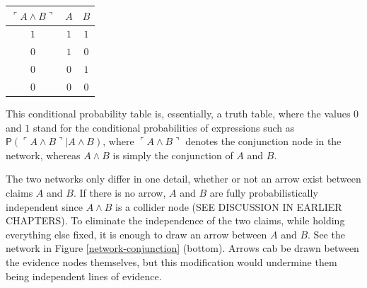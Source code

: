 \documentclass[10pt,dvipsnames,enabledeprecatedfontcommands]{scrartcl}
\newcommand{\pr}[1]{\mathsf{P}(#1)}
\begin{document}
\begin{center}
\begin{tabular}{ c | c c}
$\ulcorner A\wedge B \urcorner$  & $A$  & $B$\\
\hline
$1$  & $1$  & $1$\\
$0$  & $1$  & $0$\\
$0$  & $0$  & $1$\\
$0$  & $0$  & $0$\\
\end{tabular}
\end{center}

\noindent
This conditional probability table is, essentially, a truth table, where
the values \(0\) and \(1\) stand for the conditional probabilities of
expressions such as
\(\pr{\ulcorner A\wedge B \urcorner \vert A \wedge B}\), where
\(\ulcorner A\wedge B \urcorner\) denotes the conjunction node in the
network, whereas \(A \wedge B\) is simply the conjunction of \(A\) and
\(B\).

The two networks only differ in one detail, whether or not an arrow
exist between claims \(A\) and \(B\). If there is no arrow, \(A\) and
\(B\) are fully probabilistically independent since \(A\wedge B\) is a
collider node (SEE DISCUSSION IN EARLIER CHAPTERS). To eliminate the
independence of the two claims, while holding everything else fixed, it
is enough to draw an arrow between \(A\) and \(B\). See the network in
Figure \ref{network-conjunction} (bottom). Arrows cab be drawn between
the evidence nodes themselves, but this modification would undermine
them being independent lines of evidence.
\end{document}
